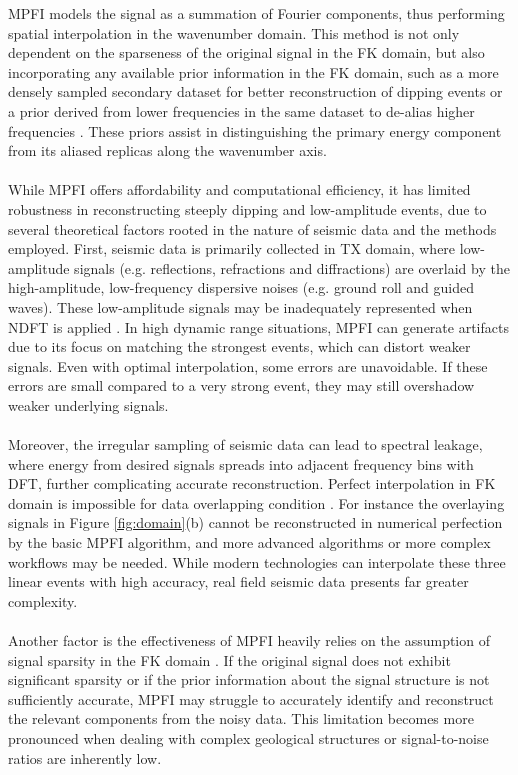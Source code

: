 \noindent MPFI models the signal as a summation of Fourier components, thus performing spatial interpolation in the wavenumber domain. This method is not only dependent on the sparseness of the original signal in the FK domain, but also incorporating any available prior information in the FK domain, such as a more densely sampled secondary dataset for better reconstruction of dipping events or a prior derived from lower frequencies in the same dataset to de-alias higher frequencies \cite{schonewille2013matching}. These priors assist in distinguishing the primary energy component from its aliased replicas along the wavenumber axis.
\\\\
While MPFI offers affordability and computational efficiency, it has limited robustness in reconstructing steeply dipping and low-amplitude events, due to several theoretical factors rooted in the nature of seismic data and the methods employed. First, seismic data is primarily collected in TX domain, where low-amplitude signals (e.g. reflections, refractions and diffractions) are overlaid by the high-amplitude, low-frequency dispersive noises (e.g. ground roll and guided waves). These low-amplitude signals may be inadequately represented when NDFT is applied \cite{bilsby2023multistage}. In high dynamic range situations, MPFI can generate artifacts due to its focus on matching the strongest events, which can distort weaker signals. Even with optimal interpolation, some errors are unavoidable. If these errors are small compared to a very strong event, they may still overshadow weaker underlying signals. 
\\\\
Moreover, the irregular sampling of seismic data can lead to spectral leakage, where energy from desired signals spreads into adjacent frequency bins with DFT, further complicating accurate reconstruction. Perfect interpolation in FK domain is impossible for data overlapping condition \cite{soubaras1997spatial}. For instance the overlaying signals in Figure \ref{fig:domain}(b) cannot be reconstructed in numerical perfection by the basic MPFI algorithm, and more advanced algorithms or more complex workflows may be needed. While modern technologies can interpolate these three linear events with high accuracy, real field seismic data presents far greater complexity.
\\\\
Another factor is the effectiveness of MPFI heavily relies on the assumption of signal sparsity in the FK domain \cite{xu2010antileakage}. If the original signal does not exhibit significant sparsity or if the prior information about the signal structure is not sufficiently accurate, MPFI may struggle to accurately identify and reconstruct the relevant components from the noisy data. This limitation becomes more pronounced when dealing with complex geological structures or signal-to-noise ratios are inherently low.

